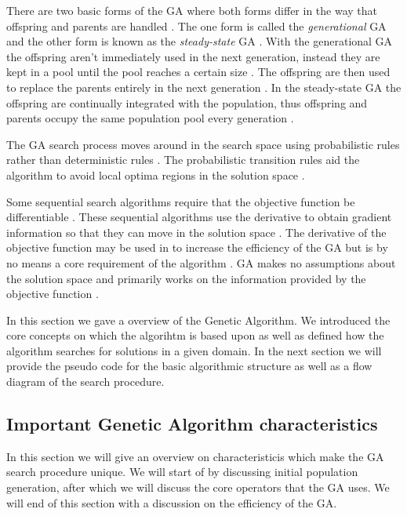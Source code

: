 There are two basic forms of the GA where both forms differ in the way that offspring and parents are handled \cite{FamilyGA}. The one form is called the \emph{generational} GA  and the other form is known as the \emph{steady-state} GA \cite{GeostatisticalGA,FamilyGA}. With the generational GA the offspring aren't immediately used in the next generation, instead they are kept in a pool until the pool reaches a certain size \cite{FamilyGA}. The offspring are then used to replace the parents entirely in the next generation \cite{FamilyGA}. In the steady-state GA the offspring are continually integrated with the population, thus offspring and parents occupy the same population pool every generation \cite{GeostatisticalGA,FamilyGA}.

The GA search process moves around in the search space using probabilistic rules rather than deterministic rules \cite{FamilyGA}. The probabilistic transition rules aid the algorithm to avoid local optima regions in the solution space \cite{HybridIntelliGA}. 

Some sequential search algorithms require that the objective function be differentiable \cite{ConstrainedGA}. These sequential algorithms use the derivative to obtain gradient information so that they can move in the solution space \cite{ConstrainedGA,SelfAdaptiveGA}. The derivative of the objective function may be used in to increase the efficiency of the GA but is by no means a core requirement of the algorithm \cite{ConstrainedGA,HybridIntelliGA,SelfAdaptiveGA}. GA makes no assumptions about the solution space and primarily works on the information provided by the objective function \cite{ConstrainedGA,HybridIntelliGA}. 

In this section we gave a overview of the Genetic Algorithm. We introduced the core concepts on which the algorihtm is based upon as well as defined how the algorithm searches for solutions in a given domain. In the next section we will provide the pseudo code for the basic algorithmic structure as well as a flow diagram of the search procedure.

\subsection{Important Genetic Algorithm characteristics}
In this section we will give an overview on characteristicis which make the GA search procedure unique. We will start of by discussing initial population generation, after which we will discuss the core operators that the GA uses. We will end of this section with a discussion on the efficiency of the GA.
